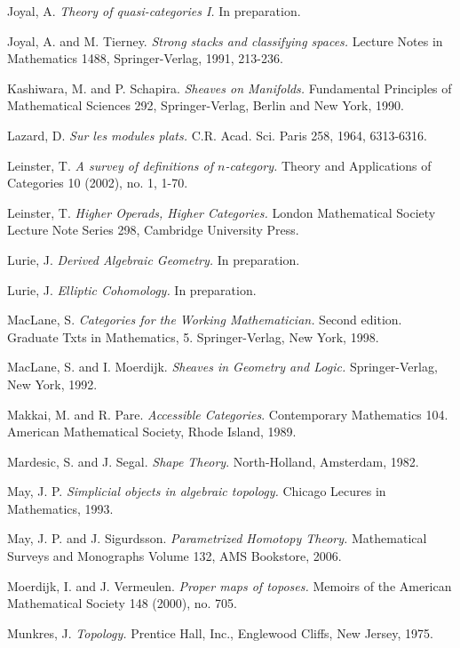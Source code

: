 \documentclass{report}[10pt, final]
\theoremstyle{definition}
\begin{document}
\begin{EndMatter}
\begin{thebibliography}{99}
 Joyal, A. {\it Theory of quasi-categories I.} In preparation.

 Joyal, A. and M. Tierney. {\it Strong stacks and classifying spaces.} 
Lecture Notes in Mathematics 1488, Springer-Verlag, 1991, 213-236.

 Kashiwara, M. and P. Schapira. {\it Sheaves on Manifolds.} Fundamental Principles of Mathematical Sciences 292, Springer-Verlag, Berlin and New York, 1990. 

 Lazard, D. {\it Sur les modules plats.} C.R.
Acad. Sci. Paris 258, 1964, 6313-6316.

 Leinster, T. {\it A survey of definitions of $n$-category.} Theory and Applications of Categories 10 (2002), no. 1, 1-70.

 Leinster, T. {\it Higher Operads, Higher Categories.} London Mathematical Society Lecture Note Series 298, Cambridge University Press.

 Lurie, J. {\it Derived Algebraic Geometry.} In preparation.

 Lurie, J. {\it Elliptic Cohomology.} In preparation.

 MacLane, S. {\it Categories for the Working Mathematician.} Second edition. Graduate Txts in Mathematics, 5. Springer-Verlag, New York, 1998.

 MacLane, S. and I. Moerdijk. {\it Sheaves in Geometry and Logic.} Springer-Verlag, New York, 1992.

 Makkai, M. and R. Pare. {\it Accessible Categories}.
Contemporary Mathematics 104. American Mathematical Society, Rhode
Island, 1989.

 Mardesic, S. and J. Segal. {\it Shape Theory}.
North-Holland, Amsterdam, 1982.

 May, J. P. {\it Simplicial objects in algebraic topology.} Chicago Lecures in Mathematics, 1993.

 May, J. P. and J. Sigurdsson. {\it Parametrized Homotopy Theory.} Mathematical Surveys and Monographs Volume 132, AMS Bookstore, 2006.

 Moerdijk, I. and J. Vermeulen. {\it Proper maps of toposes.} Memoirs of the American Mathematical Society 148 (2000), no. 705.

 Munkres, J. {\it Topology.} Prentice Hall,
Inc., Englewood Cliffs, New Jersey, 1975.


\end{thebibliography}
\end{EndMatter}
\end{document}
